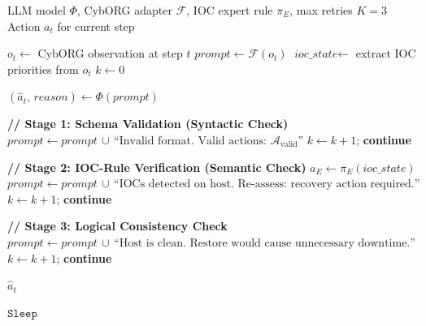
\begin{algorithm}[t]
\caption{Chain-of-Self-Correction (CoSC) Agent Policy}
\label{alg:cosc}
\begin{algorithmic}[1]
\REQUIRE LLM model $\Phi$, CybORG adapter $\mathcal{F}$,
         IOC expert rule $\pi_E$, max retries $K=3$
\ENSURE  Action $a_t$ for current step

\STATE $o_t \gets$ CybORG observation at step $t$
\STATE $\textit{prompt} \gets \mathcal{F}(o_t)$
\STATE $\textit{ioc\_state} \gets$ extract IOC priorities from $o_t$
\STATE $k \gets 0$

    \STATE $(\hat{a}_t,\, \textit{reason}) \gets \Phi(\textit{prompt})$

    \STATE \textbf{// Stage 1: Schema Validation (Syntactic Check)}
        \STATE $\textit{prompt} \gets \textit{prompt} \,\cup\,
               \text{``Invalid format. Valid actions: } \mathcal{A}_{\text{valid}}\text{''}$
        \STATE $k \gets k + 1$;\; \textbf{continue}
    \ENDIF

    \STATE \textbf{// Stage 2: IOC-Rule Verification (Semantic Check)}
    \STATE $a_E \gets \pi_E(\textit{ioc\_state})$
        \STATE $\textit{prompt} \gets \textit{prompt} \,\cup\,
               \text{``IOCs detected on host. Re-assess: recovery action required.''}$
        \STATE $k \gets k + 1$;\; \textbf{continue}
    \ENDIF

    \STATE \textbf{// Stage 3: Logical Consistency Check}
        \STATE $\textit{prompt} \gets \textit{prompt} \,\cup\,
               \text{``Host is clean. Restore would cause unnecessary downtime.''}$
        \STATE $k \gets k + 1$;\; \textbf{continue}
    \ENDIF

    \RETURN $\hat{a}_t$
\ENDWHILE

\RETURN $\texttt{Sleep}$
\end{algorithmic}
\end{algorithm}



